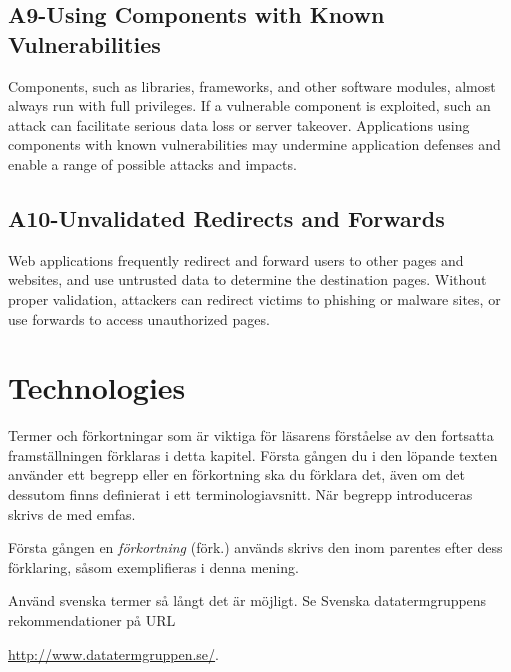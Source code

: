 \subsection{A9-Using Components with Known Vulnerabilities}
\noindent
Components, such as libraries, frameworks, and other software modules, almost always run with full privileges. If a vulnerable component is exploited, such an attack can facilitate serious data loss or server takeover. Applications using components with known vulnerabilities may undermine application defenses and enable a range of possible attacks and impacts.

\subsection{A10-Unvalidated Redirects and Forwards}
\noindent
Web applications frequently redirect and forward users to other pages and websites, and use untrusted data to determine the destination pages. Without proper validation, attackers can redirect victims to phishing or malware sites, or use forwards to access unauthorized pages.



\section{Technologies}
\label{sec:technologies}
\noindent

Termer och förkortningar som är viktiga för läsarens förståelse av den 
fortsatta framställningen förklaras i detta kapitel.
Första gången du i den löpande texten använder ett begrepp eller en förkortning 
ska du förklara det, även om det dessutom finns definierat i ett 
terminologiavsnitt.
När begrepp introduceras skrivs de med emfas.

Första gången en \emph{förkortning} (förk.) används skrivs den inom parentes 
efter dess förklaring, såsom exemplifieras i denna mening.

Använd svenska termer så långt det är möjligt.
Se Svenska datatermgruppens rekommendationer på URL
\begin{center}
	\url{http://www.datatermgruppen.se/}.
\end{center}



